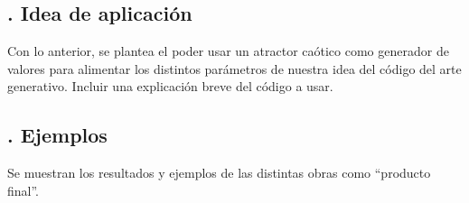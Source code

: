 \documentclass[letterpaper, 12pt]{article}
\begin{document}
\subsection*{{. Idea de aplicación}} \justify
Con lo anterior, se plantea el poder usar un atractor caótico como generador de valores para alimentar
los distintos parámetros de nuestra idea del código del arte generativo. Incluir una explicación breve del código a usar.
\subsection*{{. Ejemplos}} \justify
Se muestran los resultados y ejemplos de las distintas obras como ``producto final''.
\end{document}
